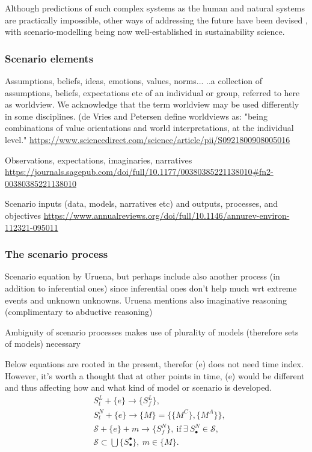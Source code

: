 \documentclass{article}
\begin{document}
\begin{refsection}
Although predictions of such complex systems as the human and natural systems are practically impossible, other ways of addressing the future have been devised \parencite{polasky_2011}, with scenario-modelling being now well-established in sustainability science.

\subsubsection{Scenario elements}
Assumptions, beliefs, ideas, emotions, values, norms...
..a collection of assumptions, beliefs, expectations etc of an individual or group, referred to here as worldview. 
We acknowledge that the term worldview may be used differently in some disciplines.
(de Vries and Petersen define worldviews as: "being combinations of value orientations and world interpretations, at the individual level." \url{https://www.sciencedirect.com/science/article/pii/S0921800908005016}

Observations, expectations, imaginaries, narratives \url{https://journals.sagepub.com/doi/full/10.1177/00380385221138010#fn2-00380385221138010}

Scenario inputs (data, models, narratives etc) and outputs, processes, and objectives \url{https://www.annualreviews.org/doi/full/10.1146/annurev-environ-112321-095011}


\subsubsection{The scenario process}
Scenario equation by Uruena, but perhaps include also another process (in addition to inferential ones) since inferential ones don't help much wrt extreme events and unknown unknowns. Uruena mentions also imaginative reasoning (complimentary to abductive reasoning)

Ambiguity of scenario processes makes use of plurality of models (therefore sets of models) necessary

Below equations are rooted in the present, therefor (e) does not need time index. However, it's worth a thought that at other points in time, (e) would be different and thus affecting how and what kind of model or scenario is developed.
\begin{align}
        &{S}^{L}_{t} + \{e\} \rightarrow \{{S}^{L}_{f}\}, \label{eq:scenario_qualitative}\\
        &{S}^{N}_{t} + \{e\} \rightarrow \{M\} = \{\{{M}^{C}\}, \{{M}^{A}\}\}, \label{eq:model_generation}\\
        &\mathcal{S} + \{e\} + m \rightarrow \{{S}^{N}_{f}\},\ \text{if}\ \exists\ {S}^{N}_{\bullet} \in \mathcal{S}, \label{eq:scenario_quantitative}\\
        &\mathcal{S} \subset \bigcup \{{S}^{\bullet}_{\bullet}\},\ m \in \{M\}. \label{eq:state_set}
\end{align}



\end{refsection}
\end{document}
